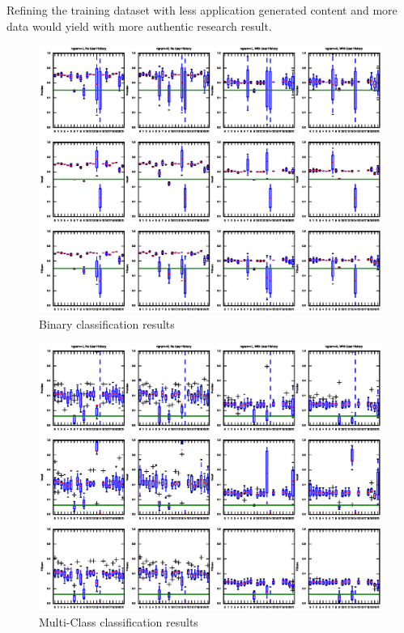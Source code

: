 \documentclass[twoside,11pt]{article}
\begin{document}
Refining the training dataset with less application generated content and more data would yield with more authentic research result.
\noindent\begin{figure}
    \centering
    \includegraphics[width=\paperwidth]{figures/binary.eps}
    \caption{Binary classification results}
\end{figure}
\noindent\begin{figure}
    \centering
    \includegraphics[width=\paperwidth]{figures/multi_class}
    \caption{Multi-Class classification results}
\end{figure}
\newpage



\end{document}
